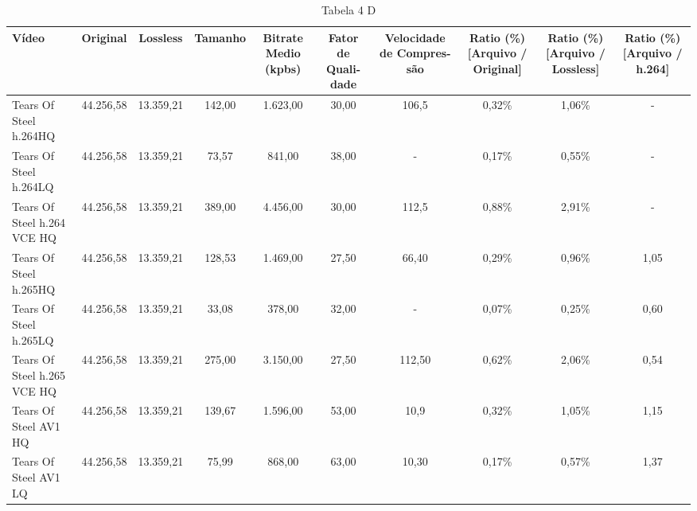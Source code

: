 \begin{table}[H]
    \centering
    \caption{Tabela 4 D}
    \label{tab:tabela4d}
    \footnotesize
    \begin{tabularx}{\textwidth}{X|C|C|C|C|C|C|C|C|C}
        \hline
        
        Vídeo & Original & Lossless & Tamanho & Bitrate Medio (kpbs) & Fator de Quali- dade & Velocidade de Compres- são & Ratio (\%) [Arquivo / Original] & Ratio (\%) [Arquivo / Lossless] & Ratio (\%) [Arquivo / h.264] \\ \hline
        Tears Of Steel h.264HQ & 44.256,58 & 13.359,21 & 142,00 & 1.623,00 & 30,00 & 106,5 & 0,32\% & 1,06\% & - \\ \hline
        Tears Of Steel h.264LQ & 44.256,58 & 13.359,21 & 73,57 & 841,00 & 38,00 & - & 0,17\% & 0,55\% & - \\ \hline
        Tears Of Steel h.264 VCE HQ & 44.256,58 & 13.359,21 & 389,00 & 4.456,00 & 30,00 & 112,5 & 0,88\% & 2,91\% & - \\ \hline
        Tears Of Steel h.265HQ & 44.256,58 & 13.359,21 & 128,53 & 1.469,00 & 27,50 & 66,40 & 0,29\% & 0,96\% & 1,05 \\ \hline
        Tears Of Steel h.265LQ & 44.256,58 & 13.359,21 & 33,08 & 378,00 & 32,00 & - & 0,07\% & 0,25\% & 0,60 \\ \hline
        Tears Of Steel h.265 VCE HQ & 44.256,58 & 13.359,21 & 275,00 & 3.150,00 & 27,50 & 112,50 & 0,62\% & 2,06\% & 0,54 \\ \hline
        Tears Of Steel AV1 HQ & 44.256,58 & 13.359,21 & 139,67 & 1.596,00 & 53,00 & 10,9 & 0,32\% & 1,05\% & 1,15 \\ \hline
        Tears Of Steel AV1 LQ & 44.256,58 & 13.359,21 & 75,99 & 868,00 & 63,00 & 10,30 & 0,17\% & 0,57\% & 1,37 \\ \hline
    \end{tabularx}


\end{table}
        


